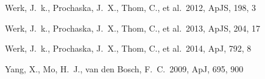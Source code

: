 \documentclass[useAMS,usenatbib]{mn2e}
\def \apj {ApJ}
\def \apjs {ApJS}
\begin{document}
\begin{thebibliography}{}
 Werk, J.~k., Prochaska, J.~X., Thom, C., et al.\ 2012, \apjs, 198, 3

 Werk, J.~k., Prochaska, J.~X., Thom, C., et al.\ 2013, \apjs, 204, 17

 Werk, J.~k., Prochaska, J.~X., Thom, C., et al.\ 2014, \apj, 792, 8



 Yang, X., Mo, H.~J., van den Bosch, F.~C.\ 2009, \apj, 695, 900


\end{thebibliography}

\label{lastpage}
\end{document}
